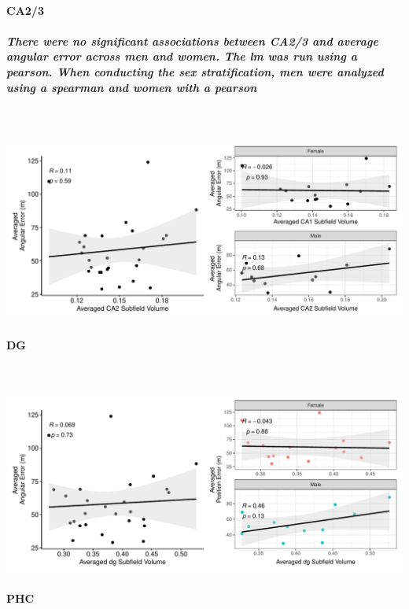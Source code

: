 \documentclass[
]{article}
\begin{document}
\newpage
\paragraph{CA2/3}

\subparagraph{There were no significant associations between CA2/3 and average angular error across men and women. The lm was run using a pearson. When conducting the sex stratification, men were analyzed using a spearman and women with a pearson}

~ \vspace{1cm}

\includegraphics{hippocampal_subfield_files/figure-latex/unnamed-chunk-2-1.pdf}

\paragraph{DG}

~ \vspace{1cm}

\includegraphics{hippocampal_subfield_files/figure-latex/unnamed-chunk-3-1.pdf}

\newpage
\paragraph{PHC}

~ \vspace{1cm}
\end{document}
